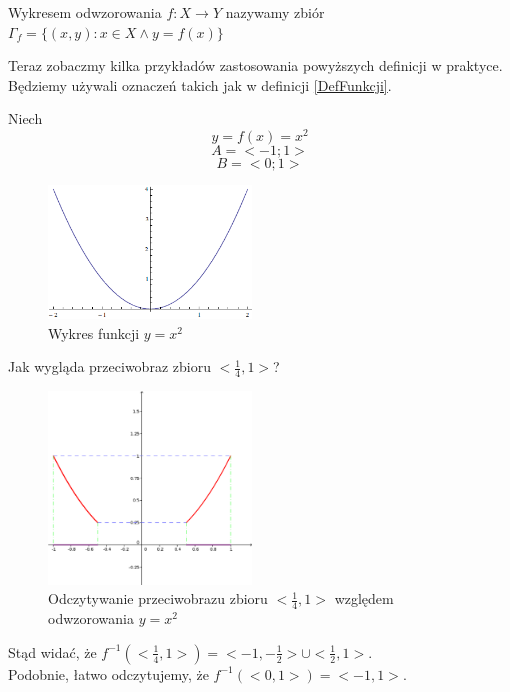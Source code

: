\begin{definicja}
Wykresem odwzorowania $f:X\rightarrow Y$ nazywamy zbiór $\Gamma_{f}=\{(x,y):x\in X \land y=f(x)\}$
\end{definicja}


Teraz zobaczmy kilka przykładów zastosowania powyższych definicji w praktyce. Będziemy używali oznaczeń takich jak w definicji \ref{DefFunkcji}.

\begin{przyklad}
Niech
$$y=f(x)=x^2$$
$$ A = <-1;1> $$
$$ B = <0;1> $$

\begin{figure}[h!]
  \begin{center}
    \includegraphics[width=0.48\textwidth]{./podrozdzial01-obrazki/parabola.png}
  \end{center}
  \caption{Wykres funkcji $ y=x^2 $}
\end{figure}
Jak wygląda przeciwobraz zbioru $<\frac{1}{4},1> $?

\begin{figure}[H]
  \begin{center}
    \includegraphics[width=0.48\textwidth]{./podrozdzial01-obrazki/przeciwobraz-parabola.png}
  \end{center}
  \caption{Odczytywanie przeciwobrazu zbioru $<\frac{1}{4},1> $ względem odwzorowania $ y=x^2 $}
\end{figure}
Stąd widać, że $f^{-1}(<\frac{1}{4},1>)= <-1,-\frac{1}{2}> \cup <\frac{1}{2},1> $.
\\Podobnie, łatwo odczytujemy, że $f^{-1}(<0,1>)= <-1,1>$.
\end{przyklad}

